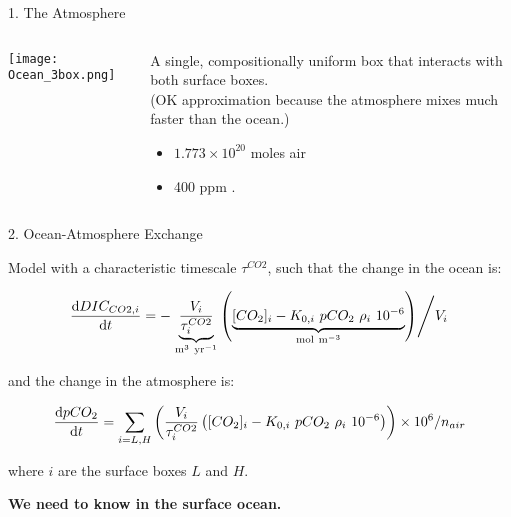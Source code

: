 \begin{frame}{1. The Atmosphere}

    \begin{columns}
        \begin{column}{0.6\linewidth}
            \texttt{[image: Ocean\_3box.png]}
        \end{column}   
        \begin{column}{0.35\linewidth}
            A single, compositionally uniform box that interacts with both surface boxes. \\
            \tiny (OK approximation because the atmosphere mixes much faster than the ocean.) 
            
            \normalsize\bigskip
            \begin{itemize}
                \item $1.773 \times 10^{20}$ moles air
                \item 400 ppm .
            \end{itemize}
        \end{column} 
    \end{columns}
    
\end{frame}

\begin{frame}{2. Ocean-Atmosphere Exchange}

    Model with a characteristic timescale $\tau^{CO2}$, such that the change in the ocean is:

    $$
    \frac{\mathrm{d}DIC_{CO2,i}}{\mathrm{d}t} = - \left. \underbrace{\frac{V_i}{\tau^{CO2}_i}}_{\mathrm{m^3~yr^{-1}}} \left( \underbrace{[CO_2]_i - K_{0,i} ~ pCO_2 ~ \rho_i ~ 10^{-6}}_{\mathrm{mol~m^{-3}}} \right) \middle/ V_i \right.
    $$

    and the change in the atmosphere is:

    $$
    \frac{\mathrm{d}pCO_2}{\mathrm{d}t} = \sum_{i=L,H} \left(\frac{V_i}{\tau^{CO2}_i} \left([CO_2]_i - K_{0,i} ~ pCO_2 ~ \rho_i ~ 10^{-6} \right) \right) \times 10^{6} / n_{air}
    $$

    where $i$ are the surface boxes $L$ and $H$.
    
    \bigskip
    \textbf{We need to know \ce{[CO_2^*]} in the surface ocean.}

\end{frame}

